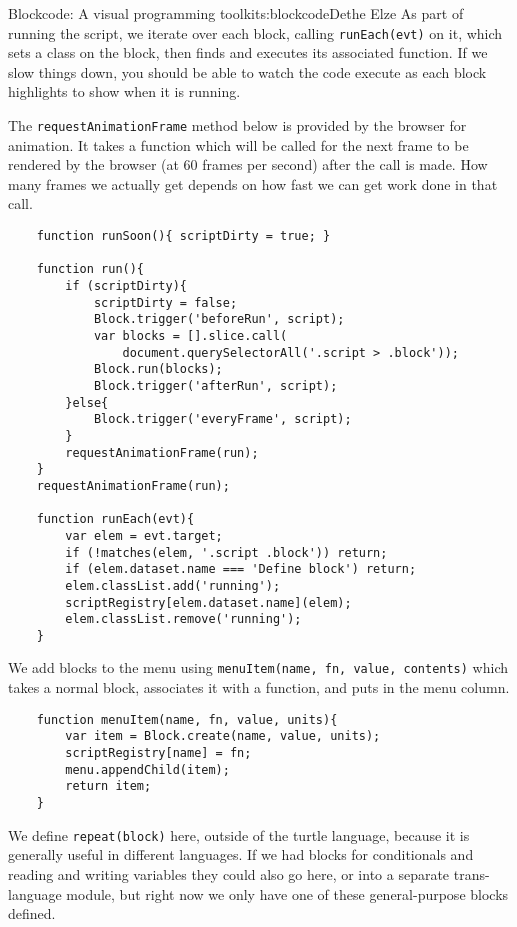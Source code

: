 \begin{aosachapter}{Blockcode: A visual programming toolkit}{s:blockcode}{Dethe Elze}
As part of running the script, we iterate over each block, calling
\texttt{runEach(evt)} on it, which sets a class on the block, then finds
and executes its associated function. If we slow things down, you should
be able to watch the code execute as each block highlights to show when
it is running.

The \texttt{requestAnimationFrame} method below is provided by the
browser for animation. It takes a function which will be called for the
next frame to be rendered by the browser (at 60 frames per second) after
the call is made. How many frames we actually get depends on how fast we
can get work done in that call.

\begin{verbatim}
    function runSoon(){ scriptDirty = true; }

    function run(){
        if (scriptDirty){
            scriptDirty = false;
            Block.trigger('beforeRun', script);
            var blocks = [].slice.call(
                document.querySelectorAll('.script > .block'));
            Block.run(blocks);
            Block.trigger('afterRun', script);
        }else{
            Block.trigger('everyFrame', script);
        }
        requestAnimationFrame(run);
    }
    requestAnimationFrame(run);

    function runEach(evt){
        var elem = evt.target;
        if (!matches(elem, '.script .block')) return;
        if (elem.dataset.name === 'Define block') return;
        elem.classList.add('running');
        scriptRegistry[elem.dataset.name](elem);
        elem.classList.remove('running');
    }
\end{verbatim}

We add blocks to the menu using
\texttt{menuItem(name, fn, value, contents)} which takes a normal block,
associates it with a function, and puts in the menu column.

\begin{verbatim}
    function menuItem(name, fn, value, units){
        var item = Block.create(name, value, units);
        scriptRegistry[name] = fn;
        menu.appendChild(item);
        return item;
    }
\end{verbatim}

We define \texttt{repeat(block)} here, outside of the turtle language,
because it is generally useful in different languages. If we had blocks
for conditionals and reading and writing variables they could also go
here, or into a separate trans-language module, but right now we only
have one of these general-purpose blocks defined.


\end{aosachapter}
